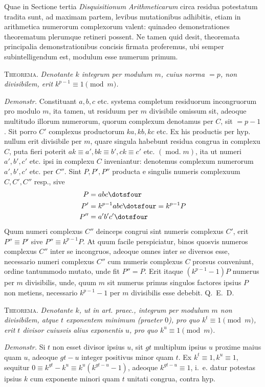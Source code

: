 %
Quae in Sectione tertia \emph{Disquisitionum Arithmeticarum} circa residua potestatum tradita sunt, ad maximam partem, levibus mutationibus adhibitis, etiam in arithmetica numerorum complexorum valent: quinadeo demonstrationes theorematum plerumque retineri possent. Ne tamen quid desit, theoremata principalia demonstrationibus concisis firmata proferemus, ubi semper subintelligendum est, modulum esse numerum primum.

\textsc{Theorema.} \emph{Denotante $k$ integrum per modulum $m$, cuius norma $=p$, non divisibilem, erit $k^{p-1}\equiv1\pmod m$.}

\emph{Demonstr.} Constituant $a,b,c$ etc. systema completum residuorum incongruorum pro modulo $m$, ita tamen, ut residuum per $m$ divisibile omissum sit, adeoque multitudo illorum numerorum, quorum complexum denotamus per $C$, sit $=p-1$. Sit porro $C'$ complexus productorum $ka,kb,kc$ etc. Ex his productis per hyp. nullum erit divisibile per $m$, quare singula habebunt residua congrua in complexu $C$, puta fieri poterit $ak\equiv a',bk\equiv b',ck\equiv c'$ etc. $(\operatorname{mod.}m)$, ita ut numeri $a',b',c'$ etc. ipsi in complexu $C$ inveniantur: denotemus complexum numerorum $a',b',c'$ etc. per $C''$. Sint $P,P',P''$ producta e singulis numeris complexuum $C,C',C''$ resp., sive
\[
\begin{aligned}
P&=abc\dotsfour\\
P'&=k^{p-1}abc\dotsfour=k^{p-1}P\\
P''&=a'b'c'\dotsfour
\end{aligned}
\]
Quum numeri complexus $C''$ deinceps congrui sint numeris complexus $C'$, erit $P''\equiv P'$ sive $P''\equiv k^{p-1}P$. At quum facile perspiciatur, binos quosvis numeros complexus $C''$ inter se incongruos, adeoque omnes inter se diversos esse, necessario numeri complexus $C''$ cum numeris complexus $C$ prorsus conveniunt, ordine tantummodo mutato, unde fit $P''=P$. Erit itaque $(k^{p-1}-1)P$ numerus per $m$ divisibilis, unde, quum $m$ sit numerus primus singulos factores ipsius $P$ non metiens, necessario $k^{p-1}-1$ per $m$ divisibilis esse debebit. Q.~E.~D.

\textsc{Theorema.} \emph{Denotante $k$, ut in art. praec., integrum per modulum $m$ non divisibilem, atque $t$ exponentem minimum (praeter $0$), pro quo $k^t\equiv1\pmod m$, erit $t$ divisor cuiusvis alius exponentis $u$, pro quo $k^u\equiv1\pmod m$.}

%
\emph{Demonstr.} Si $t$ non esset divisor ipsius $u$, sit $gt$ multiplum ipsius $u$ proxime maius quam $u$, adeoque $gt-u$ integer positivus minor quam $t$. Ex $k^t\equiv1,k^u\equiv1$, sequitur $0\equiv k^{gt}-k^u\equiv k^u(k^{gt-u}-1)$, adeoque $k^{gt-u}\equiv1$, i.~e. datur potestas ipsius $k$ cum exponente minori quam $t$ unitati congrua, contra hyp.

